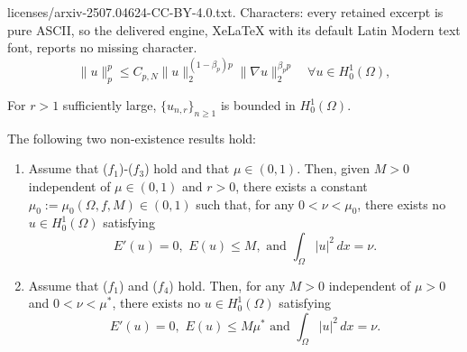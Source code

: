 \documentclass[10pt,a4paper]{amsart}
\begin{document}
licenses/arxiv-2507.04624-CC-BY-4.0.txt. Characters: every retained excerpt is pure ASCII, so the delivered engine, XeLaTeX with its default Latin Modern text font, reports no missing character.
\begin{equation}\label{eqgn}
    \|u\|_{p}^p \leq C_{p,N} \|u\|_{2}^{(1 - \beta_p)p} \|\nabla u\|_{2}^{\beta_p p} \quad \forall u \in  H_0^1(\Omega),
\end{equation}

\begin{lemma}\label{lembounded}
    For $r>1$ sufficiently large, $\{u_{n,r}\}_{n\geq 1}$ is bounded in $H^1_0(\Omega)$.
\end{lemma}

\begin{lemma}\label{lemnex}
The following two non-existence results hold:
    \begin{enumerate}[label=\rm(\roman*)]
        \item Assume that ($f_1$)-($f_3$) hold and that $\mu \in (0,1)$. Then, given $M>0$ independent of $\mu \in (0,1)$ and $r>0$, there exists a constant $\mu_0:=\mu_0(\Omega,f,M) \in (0,1)$ such that, for any $0<\nu<\mu_0$, there exists no $u \in H^1_0(\Omega)$ satisfying
             $$
             E'(u) = 0,\,\,E(u)\leq M,\,\,\text{and}\,\,\int_{\Omega}|u|^2\,dx=\nu.
             $$
        \item Assume that ($f_1$) and ($f_4$) hold. Then, for any $M>0$  independent of $\mu >0$ and $0<\nu<\mu^*$, there exists no $u \in H_0^1(\Omega)$ satisfying
             $$
             E'(u) = 0,\,\,E(u)\leq M\mu^*\,\,\text{and}\,\,\int_{\Omega}|u|^2 \,dx=\nu.
             $$
    \end{enumerate}
\end{lemma}
\end{document}
